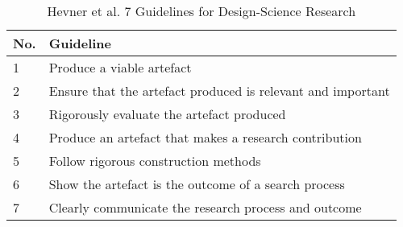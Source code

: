 \begin{table}[ht]
  \begin{center}
    \caption{Hevner et al. 7 Guidelines for Design-Science Research}
    \label{tab:HevnerGuidelines}
    \begin{tabular}{|l|l|} %
      \hline
      \textbf{No.} & \textbf{Guideline}                                          \\
      \hline
      1            & Produce a viable artefact                                   \\
      \hline
      2            & Ensure that the artefact produced is relevant and important \\
      \hline
      3            & Rigorously evaluate the artefact produced                   \\
      \hline
      4            & Produce an artefact that makes a research contribution      \\
      \hline
      5            & Follow rigorous construction methods                        \\
      \hline
      6            & Show the artefact is the outcome of a search process        \\
      \hline
      7            & Clearly communicate the research process and outcome        \\
      \hline
    \end{tabular}
  \end{center}
\end{table}




